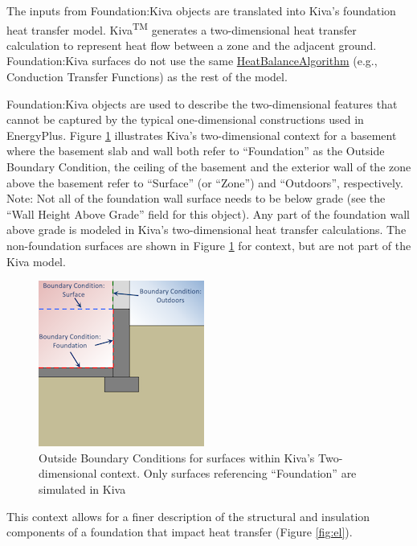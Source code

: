 The inputs from Foundation:Kiva objects are translated into Kiva's
foundation heat transfer model. Kiva\textsuperscript{TM} generates a
two-dimensional heat transfer calculation to represent heat flow between
a zone and the adjacent ground. Foundation:Kiva surfaces do not use the
same \hyperref[heatbalancealgorithm]{HeatBalanceAlgorithm} (e.g., Conduction Transfer Functions) as the
rest of the model.

Foundation:Kiva objects are used to describe the two-dimensional
features that cannot be captured by the typical one-dimensional
constructions used in EnergyPlus. Figure \ref{fig:context} illustrates
Kiva's two-dimensional context for a basement where the basement slab
and wall both refer to ``Foundation'' as the Outside Boundary Condition,
the ceiling of the basement and the exterior wall of the zone above the
basement refer to ``Surface'' (or ``Zone'') and ``Outdoors'',
respectively. Note: Not all of the foundation wall surface needs to be
below grade (see the ``Wall Height Above Grade'' field for this object).
Any part of the foundation wall above grade is modeled in Kiva's
two-dimensional heat transfer calculations. The non-foundation surfaces
are shown in Figure \ref{fig:context} for context, but are not part of the
Kiva model.

\begin{figure}
\centering
\includegraphics{media/kiva-2d-otherside.png}
\caption{Outside Boundary Conditions for surfaces within Kiva's
Two-dimensional context. Only surfaces referencing ``Foundation'' are
simulated in Kiva\label{fig:context}}
\end{figure}

This context allows for a finer description of the structural and
insulation components of a foundation that impact heat transfer (Figure
\ref{fig:el}).

